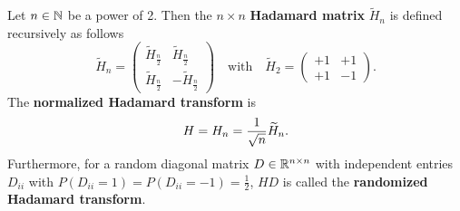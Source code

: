 \begin{definition}\label{def:hadamard}
\begin{mdframed}
Let $n\in\mathbb{N}$ be a power of 2. Then the $n\times n$ \textbf{Hadamard matrix} $\widetilde{H}_n$ is defined recursively as follows 
\begin{equation}
\widetilde{H}_n = 
\begin{pmatrix}
\widetilde{H}_{\frac{n}{2}} & \widetilde{H}_{\frac{n}{2}} \\
\widetilde{H}_{\frac{n}{2}} & - \widetilde{H}_{\frac{n}{2}}
\end{pmatrix}
\quad \text{with}\quad
\widetilde{H}_2 = 
\begin{pmatrix}
+1 & +1 \\
+1 & -1
\end{pmatrix}.
\end{equation}
The \textbf{normalized Hadamard transform} is \vspace{-0.6pc} $$H=H_n =\frac{1}{\sqrt{n}} \widetilde{H}_n.\vspace{-0.6pc} $$
Furthermore, for a random diagonal matrix $D\in \mathbb{R}^{n\times n}$ with independent entries $D_{ii}$ with $P(D_{ii}=1)=P(D_{ii}=-1)=\frac{1}{2}$, $HD$ is called the \textbf{randomized Hadamard transform}.
\end{mdframed}
\end{definition}

